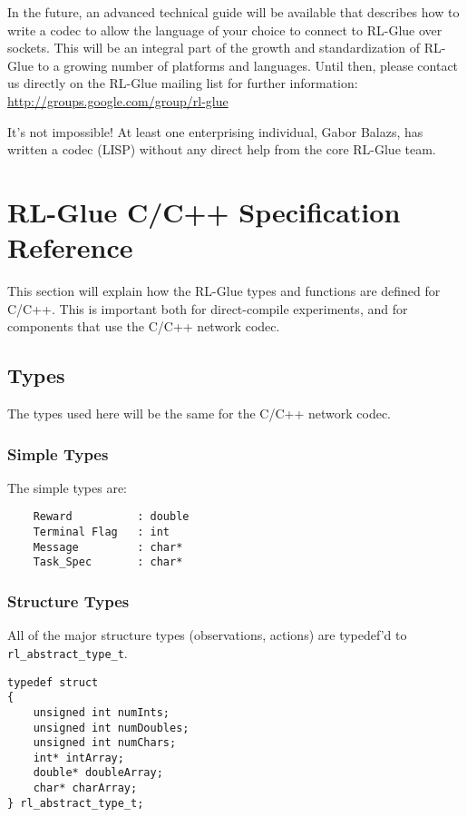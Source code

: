 \documentclass[11pt]{article}
\begin{document}
In the future, an advanced technical guide will be available that describes how to write a codec to allow the language of your choice to connect to RL-Glue over sockets.  This will be an integral part of the growth and standardization of RL-Glue to a growing number of platforms and languages.  Until then, please contact us directly on the RL-Glue mailing list for further information:\\
\url{http://groups.google.com/group/rl-glue}

It's not impossible!  At least one enterprising individual, Gabor Balazs, has written a codec (LISP) without any direct help from the core RL-Glue team.  

\section{RL-Glue C/C++ Specification Reference}
This section will explain how the RL-Glue types and functions are defined for C/C++.  This is important both for direct-compile experiments, and for components that
 use the C/C++ network codec.

\subsection{Types}
The types used here will be the same for the C/C++ network codec.

\subsubsection{Simple Types}
The simple types are:

\begin{verbatim}
    Reward          : double
    Terminal Flag   : int
    Message         : char*
    Task_Spec       : char*
\end{verbatim}

\def\rat{rl\_abstract\_type\_t}

\subsubsection{Structure Types}
\label{sec:structure-types}
All of the major structure types (observations, actions) are typedef'd to \texttt{\rat}.

\begin{verbatim}
typedef struct
{
    unsigned int numInts;
    unsigned int numDoubles;
    unsigned int numChars;
    int* intArray;
    double* doubleArray;
    char* charArray;
} rl_abstract_type_t;
\end{verbatim}
\end{document}
